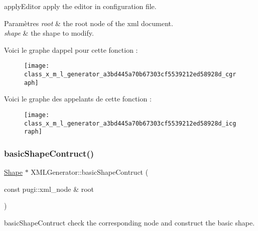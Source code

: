 apply\+Editor apply the editor in configuration file. 


\begin{DoxyParams}{Paramètres}
{\em root} & the root node of the xml document. \\
\hline
{\em shape} & the shape to modify. \\
\hline
\end{DoxyParams}
Voici le graphe d\textquotesingle{}appel pour cette fonction \+:
\nopagebreak
\begin{figure}[H]
\begin{center}
\leavevmode
\texttt{[image: class\_x\_m\_l\_generator\_a3bd445a70b67303cf5539212ed58928d\_cgraph]}
\end{center}
\end{figure}
Voici le graphe des appelants de cette fonction \+:
\nopagebreak
\begin{figure}[H]
\begin{center}
\leavevmode
\texttt{[image: class\_x\_m\_l\_generator\_a3bd445a70b67303cf5539212ed58928d\_icgraph]}
\end{center}
\end{figure}
\mbox{\label{class_x_m_l_generator_acbd95e69a36222e6f8906a77e6530f1b}} 
\subsubsection{\texorpdfstring{basic\+Shape\+Contruct()}{basicShapeContruct()}}
{\footnotesize\ttfamily \hyperlink{class_shape}{Shape} $\ast$ X\+M\+L\+Generator\+::basic\+Shape\+Contruct (\begin{DoxyParamCaption}\item[{const pugi\+::xml\+\_\+node \&}]{root }\end{DoxyParamCaption})\hspace{0.3cm}{\ttfamily [private]}}



basic\+Shape\+Contruct check the corresponding node and construct the basic shape. 


